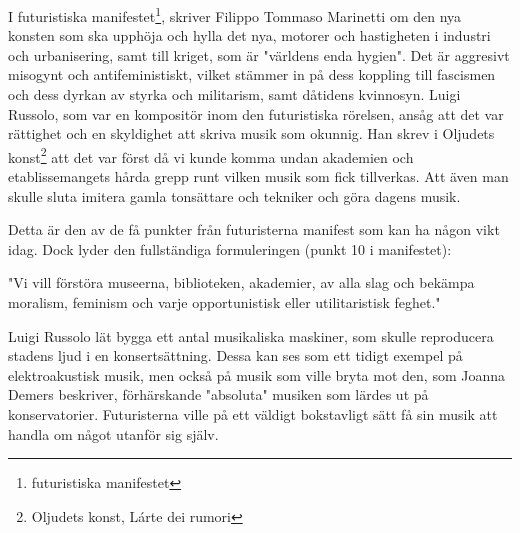 \documentclass{article}
\begin{document}
  I futuristiska manifestet\footnote{futuristiska manifestet}, skriver Filippo Tommaso Marinetti om den nya
  konsten som ska upphöja och hylla det nya, motorer och hastigheten i industri och urbanisering, samt till
  kriget, som är "världens enda hygien". Det är aggresivt misogynt och antifeministiskt, vilket stämmer in på
  dess koppling till fascismen och dess dyrkan av styrka och militarism, samt dåtidens kvinnosyn.
  Luigi Russolo, som var en kompositör inom den futuristiska rörelsen, ansåg att det var rättighet och en
  skyldighet att skriva musik som okunnig. Han skrev i Oljudets konst\footnote{Oljudets konst, Lárte dei
  rumori} att det var först då vi kunde komma undan akademien och etablissemangets hårda grepp runt vilken
  musik som fick tillverkas. Att även man skulle sluta imitera gamla tonsättare och tekniker och göra dagens
  musik.


  Detta är den av de få
  punkter från futuristerna manifest som kan ha någon vikt idag. Dock lyder den fullständiga formuleringen
  (punkt 10 i manifestet):


  "Vi vill förstöra museerna, biblioteken, akademier, av alla slag och bekämpa moralism, feminism och varje
  opportunistisk eller utilitaristisk feghet."


  Luigi Russolo lät bygga ett antal musikaliska maskiner, som skulle reproducera stadens ljud i en
  konsertsättning. Dessa kan ses som ett tidigt exempel på elektroakustisk musik, men också på musik som ville
  bryta mot den, som Joanna Demers beskriver, förhärskande "absoluta" musiken som lärdes ut på
  konservatorier. Futuristerna ville på ett väldigt bokstavligt sätt få sin musik att handla om något utanför
  sig själv. 






\end{document}

